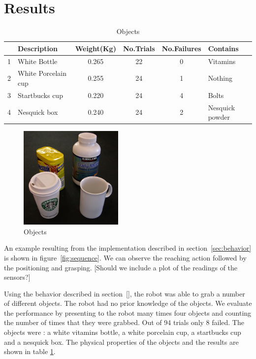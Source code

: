 \section{Results}
\label{sec:results}

\begin{table}[tb]
  \caption{Objects} \label{tab:objects} \centering
  \begin{tabular}{|c|l|c|c|c|l|}
    \hline
    &Description& Weight(Kg)&No.Trials&No.Failures&Contains \\
    \hline
    1&White Bottle        & 0.265 & 22& 0 & Vitamins\\
    2&White Porcelain cup & 0.255 & 24& 1 & Nothing\\
    3&Startbucks cup      & 0.220 & 24& 4 & Bolts \\
    4&Nesquick box        & 0.240 & 24& 2 & Nesquick powder\\

    \hline
  \end{tabular}
\end{table}

\begin{figure}[tbp]
\centerline{
\includegraphics[width=2.0in]{./figures/objects.eps}
}\caption{Objects}
\label{fig:Objects}
\end{figure}

An example resulting from the implementation described in
section~\ref{sec:behavior} is shown in figure~\ref{fig:sequence}.
We can observe the reaching action followed by the positioning and
grasping. [Should we include a plot of the readings of the
sensors?]


Using the behavior described in section~\ref{}, the robot was able
to grab a number of different objects. The robot had no prior
knowledge of the objects. We evaluate the performance by
presenting to the robot many times four objects and counting the
number of times that they were grabbed. Out of 94 trials only 8
failed. The objects were : a white vitamins bottle, a white
porcelain cup, a startbucks cup and a nesquick box. The physical
properties of the objects and the results are shown in table
\ref{tab:objects}.

